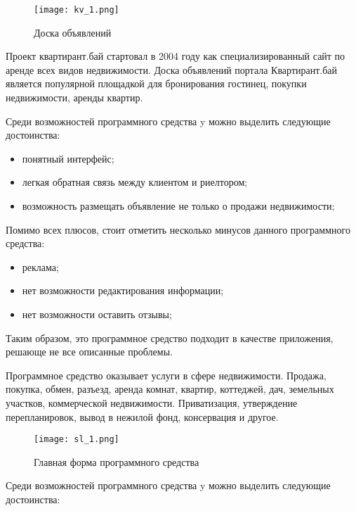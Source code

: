 \begin{figure}[!htb]
	\centering
	\texttt{[image: kv\_1.png]}
	\caption{ Доска объявлений }
	\label{fig:arch_and_mod::lexer_flow}
	\clearpage
\end{figure}

Проект квартирант.бай стартовал в 2004 году как специализированный сайт по аренде всех видов недвижимости. Доска объявлений портала Квартирант.бай является популярной площадкой для бронирования гостинец, покупки недвижимости, аренды квартир.

Среди возможностей программного средства y можно выделить следующие достоинства:

\begin{itemize}
	\item понятный интерфейс;
	\item легкая обратная связь между клиентом и риелтором;
	\item возможность размещать объявление не только о продажи недвижимости;
\end{itemize}

Помимо всех плюсов, стоит отметить несколько минусов данного программного средства:

\begin{itemize}
	\item реклама;
	\item нет возможности редактирования информации;
	\item нет возможности оставить отзывы;
\end{itemize}

Таким образом, это программное средство подходит в качестве приложения, решающе не все описанные проблемы.


Программное средство оказывает услуги в сфере недвижимости. Продажа, покупка, обмен, разъезд, аренда комнат, квартир, коттеджей, дач, земельных участков, коммерческой недвижимости. Приватизация, утверждение перепланировок, вывод в нежилой фонд, консервация и другое.

\begin{figure}[!htb]
	\centering
	\texttt{[image: sl\_1.png]}
	\caption{ Главная форма программного средства}
	\label{fig:arch_and_mod::lexer_flow}
	\clearpage
\end{figure}

Среди возможностей программного средства y можно выделить следующие достоинства:

